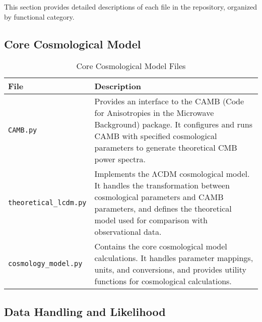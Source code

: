 \documentclass[11pt]{article}
\begin{document}
This section provides detailed descriptions of each file in the repository, organized by functional category.

\subsection{Core Cosmological Model}

\begin{table}[H]
\centering
\begin{tabular}{p{4cm}p{11cm}}
\toprule
\textbf{File} & \textbf{Description} \\
\midrule
\texttt{CAMB.py} & Provides an interface to the CAMB (Code for Anisotropies in the Microwave Background) package. It configures and runs CAMB with specified cosmological parameters to generate theoretical CMB power spectra. \\
\addlinespace
\texttt{theoretical\_lcdm.py} & Implements the ΛCDM cosmological model. It handles the transformation between cosmological parameters and CAMB parameters, and defines the theoretical model used for comparison with observational data. \\
\addlinespace
\texttt{cosmology\_model.py} & Contains the core cosmological model calculations. It handles parameter mappings, units, and conversions, and provides utility functions for cosmological calculations. \\
\bottomrule
\end{tabular}
\caption{Core Cosmological Model Files}
\label{tab:cosmology-files}
\end{table}

\subsection{Data Handling and Likelihood}
\end{document}
